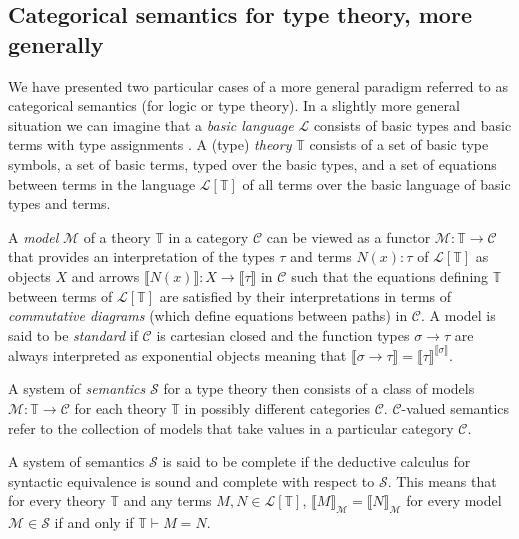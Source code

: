\subsection*{Categorical semantics for type theory, more generally}
We have presented two particular cases of a more general paradigm referred to as categorical semantics (for logic or type theory). In a slightly more general situation we can imagine that a \emph{basic language} $\mathcal{L}$ consists of basic types and basic terms with type assignments \cite{Awodey2000}. A (type) \emph{theory} $\mathbb{T}$ consists of a set of basic type symbols, a set of basic terms, typed over the basic types, and a set of equations between terms in the language $\mathcal{L}[\mathbb{T}]$ of all terms over the basic language of basic types and terms.

A \emph{model} $\mathcal{M}$ of a theory $\mathbb{T}$ in a category $\mathcal{C}$ can be viewed as a functor $\mathcal{M} \colon \mathbb{T} \rightarrow \mathcal{C}$ that provides an interpretation of the types $\tau$ and terms $N(x) \colon \tau$ of $\mathcal{L}[\mathbb{T}]$ as objects $X$ and arrows $\llbracket N(x) \rrbracket \colon X \rightarrow \llbracket \tau \rrbracket$ in $\mathcal{C}$ such that the equations defining $\mathbb{T}$ between terms of $\mathcal{L}[\mathbb{T}]$ are satisfied by their interpretations in terms of \emph{commutative diagrams} (which define equations between paths) in $\mathcal{C}$. A model is said to be \emph{standard} if $\mathcal{C}$ is cartesian closed and the function types $\sigma \rightarrow \tau$ are always interpreted as exponential objects meaning that $\llbracket \sigma \rightarrow \tau \rrbracket = \llbracket \tau \rrbracket ^ {\llbracket \sigma \rrbracket}$.

A system of \emph{semantics} $\mathcal{S}$ for a type theory then consists of a class of models $\mathcal{M} \colon \mathbb{T} \rightarrow \mathcal{C}$ for each theory $\mathbb{T}$ in possibly different categories $\mathcal{C}$. $\mathcal{C}$-valued semantics refer to the collection of models that take values in a particular category $\mathcal{C}$.

A system of semantics $\mathcal{S}$ is said to be complete if the deductive calculus for syntactic equivalence is sound and complete with respect to $\mathcal{S}$. This means that for every theory $\mathbb{T}$ and any terms $M, N \in \mathcal{L}[\mathbb{T}]$, $\llbracket M \rrbracket_{\mathcal{M}} = \llbracket N \rrbracket_{\mathcal{M}}$ for every model $\mathcal{M} \in \mathcal{S}$ if and only if $\mathbb{T} \vdash M = N$.

